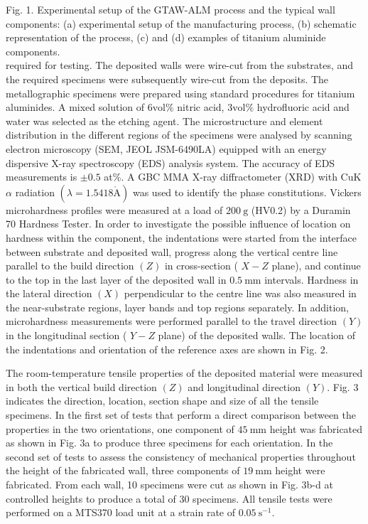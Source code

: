 \documentclass[10pt]{article}
\def\AA{\mathring{\mathrm{A}}}
\begin{document}
Fig. 1. Experimental setup of the GTAW-ALM process and the typical wall components: (a) experimental setup of the manufacturing process, (b) schematic representation of the process, (c) and (d) examples of titanium aluminide components.\\
required for testing. The deposited walls were wire-cut from the substrates, and the required specimens were subsequently wire-cut from the deposits. The metallographic specimens were prepared using standard procedures for titanium aluminides. A mixed solution of $6 \mathrm{vol} \%$ nitric acid, $3 \mathrm{vol} \%$ hydrofluoric acid and water was selected as the etching agent. The microstructure and element distribution in the different regions of the specimens were analysed by scanning electron microscopy (SEM, JEOL JSM-6490LA) equipped with an energy dispersive X-ray spectroscopy (EDS) analysis system. The accuracy of EDS measurements is $\pm 0.5$ at\%. A GBC MMA X-ray diffractometer (XRD) with CuK $\alpha$ radiation $(\lambda=1.5418 \AA)$ was used to identify the phase constitutions. Vickers microhardness profiles were measured at a load of $200 \mathrm{~g}$ (HV0.2) by a Duramin 70 Hardness Tester. In order to investigate the possible influence of location on hardness within the component, the indentations were started from the interface between substrate and deposited wall, progress along the vertical centre line parallel to the build direction $(Z)$ in cross-section ( $X-Z$ plane), and continue to the top in the last layer of the deposited wall in $0.5 \mathrm{~mm}$ intervals. Hardness in the lateral direction $(X)$ perpendicular to the centre line was also measured in the near-substrate regions, layer bands and top regions separately. In addition, microhardness measurements were performed parallel to the travel direction $(Y)$ in the longitudinal section ( $Y-Z$ plane) of the deposited walls. The location of the indentations and orientation of the reference axes are shown in Fig. 2.

The room-temperature tensile properties of the deposited material were measured in both the vertical build direction $(Z)$ and longitudinal direction $(Y)$. Fig. 3 indicates the direction, location, section shape and size of all the tensile specimens. In the first set of tests that perform a direct comparison between the properties in the two orientations, one component of $45 \mathrm{~mm}$ height was fabricated as shown in Fig. 3a to produce three specimens for each orientation. In the second set of tests to assess the consistency of mechanical properties throughout the height of the fabricated wall, three components of $19 \mathrm{~mm}$ height were fabricated. From each wall, 10 specimens were cut as shown in Fig. 3b-d at controlled heights to produce a total of 30 specimens. All tensile tests were performed on a MTS370 load unit at a strain rate of $0.05 \mathrm{~s}^{-1}$.
\end{document}
